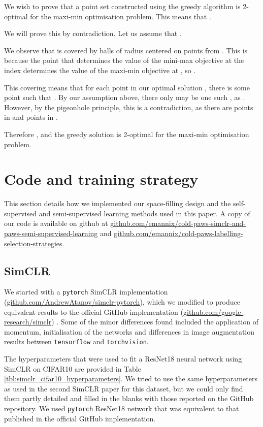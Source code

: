 \documentclass{article}
\begin{document}
We wish to prove that a point set constructed using the greedy algorithm  is 2-optimal for the maxi-min optimisation problem. This means that .

We will prove this by contradiction. Let us assume that . 

We observe that  is covered by balls of radius  centered on points from . This is because the point that determines the value of the mini-max objective at the  index determines the value of the maxi-min objective at , so .

This covering means that for each point in our optimal solution , there is some point  such that . By our assumption above, there only may be one such , as . However, by the pigeonhole principle, this is a contradiction, as there are  points in  and  points in . 

Therefore , and the greedy solution is 2-optimal for the maxi-min optimisation problem.



\section{Code and training strategy}
\label{sec:code_and_training}

This section details how we implemented our space-filling design and the self-supervised and semi-supervised learning methods used in this paper. A copy of our code is available on github at \url{github.com/emannix/cold-paws-simclr-and-paws-semi-supervised-learning} and \url{github.com/emannix/cold-paws-labelling-selection-strategies}.


\subsection{SimCLR}

We started with a \texttt{pytorch} \citep{paszke2019pytorch} SimCLR implementation (\url{github.com/AndrewAtanov/simclr-pytorch}), which we modified to produce equivalent results to the official GitHub implementation (\url{github.com/google-research/simclr}) \citep{chen2020simple, chen2020big}. Some of the minor differences found included the application of momentum, initialisation of the networks and differences in image augmentation results between \texttt{tensorflow} and \texttt{torchvision}. 

The hyperparameters that were used to fit a ResNet18 neural network using SimCLR on CIFAR10 are provided in Table \ref{tbl:simclr_cifar10_hyperparameters}. We tried to use the same hyperparameters as used in the second SimCLR paper for this dataset, but we could only find them partly detailed \citep{chen2020big} and filled in the blanks with those reported on the GitHub repository. We used \texttt{pytorch} ResNet18 network that was equivalent to that published in the official GitHub implementation.
\end{document}
